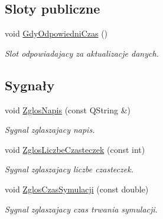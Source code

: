 \subsection*{Sloty publiczne}
\begin{DoxyCompactItemize}
\item 
void \hyperlink{class_zbiornik_aa07ceb0fcbf307f0aa1eb75c32f3f47e}{Gdy\-Odpowiedni\-Czas} ()
\begin{DoxyCompactList}\small\item\em Slot odpowiadajacy za aktualizacje danych. \end{DoxyCompactList}\end{DoxyCompactItemize}
\subsection*{Sygnały}
\begin{DoxyCompactItemize}
\item 
void \hyperlink{class_zbiornik_a2d92e4a46f9a5dda37ddd9948046580b}{Zglos\-Napis} (const Q\-String \&)
\begin{DoxyCompactList}\small\item\em Sygnal zglaszajacy napis. \end{DoxyCompactList}\item 
void \hyperlink{class_zbiornik_ad200a7e5bc038ad94131d1a354266889}{Zglos\-Liczbe\-Czasteczek} (const int)
\begin{DoxyCompactList}\small\item\em Sygnal zglaszajacy liczbe czasteczek. \end{DoxyCompactList}\item 
void \hyperlink{class_zbiornik_a96b9ee7d80fc0f29787dc060027d2805}{Zglos\-Czas\-Symulacji} (const double)
\begin{DoxyCompactList}\small\item\em Sygnal zglaszajacy czas trwania symulacji. \end{DoxyCompactList}\end{DoxyCompactItemize}
